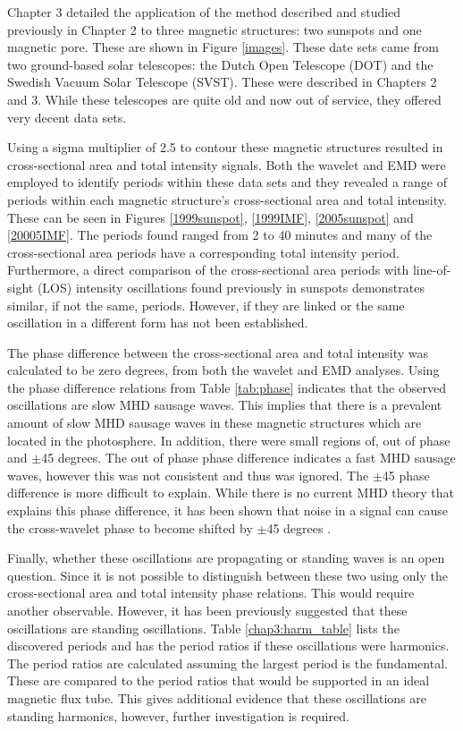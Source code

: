     Chapter 3 detailed the application of the method described and studied previously in Chapter 2 to three magnetic structures: two sunspots and one magnetic pore.
    These are shown in Figure \ref{images}.
    These date sets came from two ground-based solar telescopes: the Dutch Open Telescope (DOT) and the Swedish Vacuum Solar Telescope (SVST). 
    These were described in Chapters 2 and 3.
    While these telescopes are quite old and now out of service, they offered very decent data sets.
    
    Using a sigma multiplier of 2.5 to contour these magnetic structures
    resulted in cross-sectional area and total intensity signals.
    Both the wavelet and EMD were employed to identify periods within these data sets and they revealed a range of periods within each magnetic structure's cross-sectional area and total intensity.
    These can be seen in Figures \ref{1999sunspot}, \ref{1999IMF}, \ref{2005sunspot} and \ref{20005IMF}.
    The periods found ranged from 2 to 40 minutes and many of the cross-sectional area periods have a corresponding total intensity period.
    Furthermore, a direct comparison of the cross-sectional area periods with line-of-sight (LOS) intensity oscillations found previously in sunspots demonstrates similar, if not the same, periods.
    However, if they are linked or the same oscillation in a different form has not been established.
   
    The phase difference between the cross-sectional area and total intensity was calculated to be zero degrees, from both the wavelet and EMD analyses.
    Using the phase difference relations from Table \ref{tab:phase} indicates that the observed oscillations are slow MHD sausage waves. 
    This implies that there is a prevalent amount of slow MHD sausage waves in these magnetic structures which are located in the photosphere.
    In addition, there were small regions of, out of phase and $\pm$45 degrees.
    The out of phase phase difference indicates a fast MHD sausage waves, however this was not consistent and thus was ignored. 
    The $\pm$45 phase difference is more difficult to explain.
    While there is no current MHD theory that explains this phase difference, it has been shown that noise in a signal can cause the cross-wavelet phase to become shifted by $\pm$45 degrees \citep{2015A&A...579A..73M}.  
    
    Finally, whether these oscillations are propagating or standing waves is an open question.
    Since it is not possible to distinguish between these two using only the cross-sectional area and total intensity phase relations.
    This would require another observable.
    However, it has been previously suggested that these oscillations are standing oscillations.
    Table \ref{chap3:harm_table} lists the discovered periods and has the period ratios if these oscillations were harmonics.     
    The period ratios are calculated assuming the largest period is the fundamental.
    These are compared to the period ratios that would be supported in an ideal magnetic flux tube.
    This gives additional evidence that these oscillations are standing harmonics, however, further investigation is required.
    
